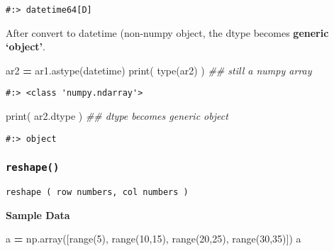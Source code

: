 \documentclass[
]{book}
\newenvironment{Shaded}{\begin{snugshade}}{\end{snugshade}}
\newcommand{\BuiltInTok}[1]{#1}
\newcommand{\CommentTok}[1]{\textcolor[rgb]{0.37,0.37,0.37}{\textit{#1}}}
\newcommand{\DecValTok}[1]{\textcolor[rgb]{0.06,0.06,0.06}{#1}}
\newcommand{\NormalTok}[1]{#1}
\newcommand{\OperatorTok}[1]{\textcolor[rgb]{0.43,0.43,0.43}{\textbf{#1}}}
\begin{document}
\begin{verbatim}
#:> datetime64[D]
\end{verbatim}

After convert to datetime (non-numpy object, the dtype becomes \textbf{generic `object'}.

\begin{Shaded}
\begin{Highlighting}[]
\NormalTok{ar2 }\OperatorTok{=}\NormalTok{ ar1.astype(datetime)}
\BuiltInTok{print}\NormalTok{( }\BuiltInTok{type}\NormalTok{(ar2) )  }\CommentTok{\#\# still a numpy array}
\end{Highlighting}
\end{Shaded}

\begin{verbatim}
#:> <class 'numpy.ndarray'>
\end{verbatim}

\begin{Shaded}
\begin{Highlighting}[]
\BuiltInTok{print}\NormalTok{( ar2.dtype )  }\CommentTok{\#\# dtype becomes generic \textquotesingle{}object\textquotesingle{}}
\end{Highlighting}
\end{Shaded}

\begin{verbatim}
#:> object
\end{verbatim}

\hypertarget{reshape}{%
\subsubsection{\texorpdfstring{\texttt{reshape()}}{reshape()}}\label{reshape}}

\begin{verbatim}
reshape ( row numbers, col numbers )
\end{verbatim}

\textbf{Sample Data}

\begin{Shaded}
\begin{Highlighting}[]
\NormalTok{a }\OperatorTok{=}\NormalTok{ np.array([}\BuiltInTok{range}\NormalTok{(}\DecValTok{5}\NormalTok{), }\BuiltInTok{range}\NormalTok{(}\DecValTok{10}\NormalTok{,}\DecValTok{15}\NormalTok{), }\BuiltInTok{range}\NormalTok{(}\DecValTok{20}\NormalTok{,}\DecValTok{25}\NormalTok{), }\BuiltInTok{range}\NormalTok{(}\DecValTok{30}\NormalTok{,}\DecValTok{35}\NormalTok{)])}
\NormalTok{a}
\end{Highlighting}
\end{Shaded}
\end{document}
